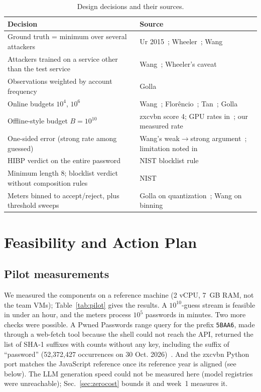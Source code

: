 \documentclass[conference]{IEEEtran}
\begin{document}
\begin{table}[t]
\centering
\caption{Design decisions and their sources.}
\label{tab:decisions}
\footnotesize
\renewcommand{\arraystretch}{1.12}
\begin{tabularx}{\columnwidth}{@{}Y Y@{}}
\toprule
\textbf{Decision} & \textbf{Source}\\
\midrule
Ground truth = minimum over several attackers & Ur 2015~\cite{ur2015}; Wheeler~\cite{wheeler2016}; Wang~\cite{wang2023}\\
Attackers trained on a service other than the test service & Wang~\cite{wang2023}; Wheeler's caveat~\cite{wheeler2016}\\
Observations weighted by account frequency & Golla~\cite{golla2018}\\
Online budgets $10^4$, $10^6$ & Wang~\cite{wang2023}; Flor\^encio~\cite{florencio2016}; Tan~\cite{tan2020}; Golla~\cite{golla2018}\\
Offline-style budget $B=10^{10}$ & zxcvbn score 4; GPU rates in~\cite{golla2018}; our measured rate\\
One-sided error (strong rate among guessed) & Wang's weak$\to$strong argument~\cite{wang2023}; limitation noted in~\cite{golla2018}\\
HIBP verdict on the entire password & NIST blocklist rule~\cite{nist80063b4}\\
Minimum length 8; blocklist verdict without composition rules & NIST~\cite{nist80063b4}\\
Meters binned to accept/reject, plus threshold sweeps & Golla on quantization~\cite{golla2018}; Wang on binning~\cite{wang2023}\\
\bottomrule
\end{tabularx}
\end{table}

\section{Feasibility and Action Plan}\label{sec:feasibility}

\subsection{Pilot measurements}
We measured the components on a reference machine (2 vCPU, 7~GB RAM, not the team VMs); Table~\ref{tab:pilot} gives the results. A $10^{10}$-guess stream is feasible in under an hour, and the meters process $10^5$ passwords in minutes. Two more checks were possible. A Pwned Passwords range query for the prefix \texttt{5BAA6}, made through a web-fetch tool because the shell could not reach the API, returned the list of SHA-1 suffixes with counts without any key, including the suffix of ``password'' (52{,}372{,}427 occurrences on 30 Oct. 2026)~\cite{hibp}. And the zxcvbn Python port matches the JavaScript reference once its reference year is aligned (see below). The LLM generation speed could not be measured here (model registries were unreachable); Sec.~\ref{sec:zerocost} bounds it and week~1 measures it.
\end{document}
